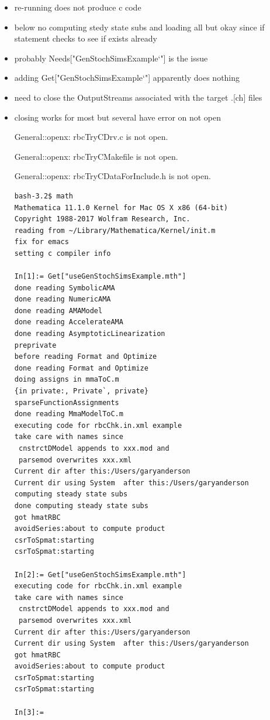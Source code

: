 \documentclass[hyperref]{labbook}
\begin{document}
 \begin{itemize}
 \item re-running  
   does not produce c code

 \item    below no computing stedy state subs and loading all  but okay since if statement checks to see if exists already

 \item    probably Needs["GenStochSimsExample`"] is the issue
   
 \item adding Get["GenStochSimsExample`"] apparently does nothing
 \item need to close the OutputStreams associated with the target .[ch] files
 \item closing works for most but several have error on not open
   
General::openx: rbcTryCDrv.c is not open.

General::openx: rbcTryCMakefile is not open.

General::openx: rbcTryCDataForInclude.h is not open.

\begin{verbatim}
bash-3.2$ math
Mathematica 11.1.0 Kernel for Mac OS X x86 (64-bit)
Copyright 1988-2017 Wolfram Research, Inc.
reading from ~/Library/Mathematica/Kernel/init.m
fix for emacs
setting c compiler info

In[1]:= Get["useGenStochSimsExample.mth"]
done reading SymbolicAMA
done reading NumericAMA
done reading AMAModel
done reading AccelerateAMA
done reading AsymptoticLinearization
preprivate
before reading Format and Optimize
done reading Format and Optimize
doing assigns in mmaToC.m
{in private:, Private`, private}
sparseFunctionAssignments
done reading MmaModelToC.m
executing code for rbcChk.in.xml example
take care with names since
 cnstrctDModel appends to xxx.mod and
 parsemod overwrites xxx.xml
Current dir after this:/Users/garyanderson
Current dir using System  after this:/Users/garyanderson
computing steady state subs
done computing steady state subs
got hmatRBC
avoidSeries:about to compute product
csrToSpmat:starting
csrToSpmat:starting

In[2]:= Get["useGenStochSimsExample.mth"]
executing code for rbcChk.in.xml example
take care with names since
 cnstrctDModel appends to xxx.mod and
 parsemod overwrites xxx.xml
Current dir after this:/Users/garyanderson
Current dir using System  after this:/Users/garyanderson
got hmatRBC
avoidSeries:about to compute product
csrToSpmat:starting
csrToSpmat:starting

In[3]:= 
\end{verbatim}
 \end{itemize}
\end{document}
